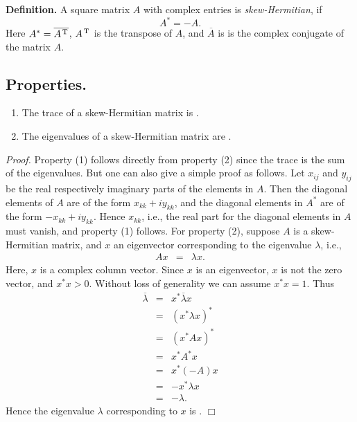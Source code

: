 \documentclass[12pt]{article}
\begin{document}
\newcommand{\ccj}[1]{\overline{#1}}
\def\dtra{\hspace{0.04cm} ^{\mbox{\scriptsize{T}}} \hspace{0.02cm}}

{\bf Definition.} A square matrix $A$ with complex entries is 
\emph{skew-Hermitian}, if
 $$ A^* = -A. $$
Here $A^\ast=\ccj{A\dtra}$, $A\dtra$ is the transpose of $A$, and $\ccj{A}$ is
is the complex conjugate of the matrix $A$.

\subsection*{Properties.}
\begin{enumerate}
\item The trace of a skew-Hermitian matrix is . 
\item The eigenvalues of a skew-Hermitian matrix are
 . 
\end{enumerate}


\emph{Proof.} Property (1) follows directly from property (2) since the
trace is the sum of the eigenvalues. But one can also give a simple proof
as follows.  Let $x_{ij}$ and $y_{ij}$ be the 
real respectively imaginary parts of the elements in $A$. 
Then the diagonal elements of $A$ are of the
form $x_{kk} + i y_{kk}$, and the diagonal elements in $A^\ast$ 
are of the form $-x_{kk} + iy_{kk}$. Hence $x_{kk}$, i.e., the real
part for the diagonal elements in $A$ must vanish, and 
property (1) follows.
For property (2), suppose 
 $A$ is a skew-Hermitian matrix, and $x$ an 
eigenvector corresponding to the eigenvalue $\lambda$, i.e.,  
\begin{eqnarray}
\label{gugg}
Ax &=& \lambda x.
\end{eqnarray}
Here, $x$ is a complex column vector. 
Since $x$ is an eigenvector, $x$ is not the zero vector, and
$x^\ast x > 0$. Without loss of generality we can assume $x^\ast x =1$.
 Thus
\begin{eqnarray*}
\ccj{\lambda} &=& x^\ast \ccj{\lambda} x\\
&=& ( x^\ast \lambda x )^\ast \\
&=& (x^\ast A x )^\ast \\
&=& x^\ast A^\ast x \\
&=& x^\ast (-A) x \\
&=& -x^\ast \lambda x \\
&=& - \lambda .
\end{eqnarray*}
Hence the eigenvalue $\lambda$ corresponding
to $x$ is . $\Box$
\end{document}
